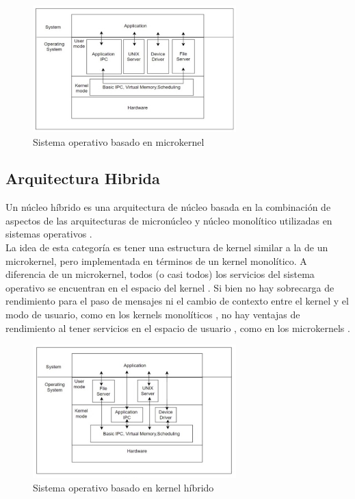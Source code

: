 \begin{figure}[H]
    \centering
    \includegraphics[width=0.7\textwidth]{figures/microkernel.jpeg}
    \caption[Sistema operativo basado en microkernel]%
            {Sistema operativo basado en microkernel \citep{harshvardhan2023kernels}}
    \label{fig:arquitectura_microkernel}
\end{figure}

\subsection{Arquitectura Hibrida}
Un núcleo híbrido es una arquitectura de núcleo basada en la combinación de aspectos de las arquitecturas de micronúcleo y núcleo monolítico utilizadas en sistemas operativos .\\
La idea de esta categoría es tener una estructura de kernel similar a la de un microkernel, pero implementada en términos de un kernel monolítico. A diferencia de un microkernel, todos (o casi todos) los servicios del sistema operativo se encuentran en el espacio del kernel . Si bien no hay sobrecarga de rendimiento para el paso de mensajes ni el cambio de contexto entre el kernel y el modo de usuario, como en los kernels monolíticos , no hay ventajas de rendimiento al tener servicios en el espacio de usuario , como en los microkernels \citep{ms_hybrid_kernel}.
\begin{figure}[H]
    \centering
    \includegraphics[width=0.7\textwidth]{figures/hibridokernel.jpeg}
    \caption[Sistema operativo basado en kernel híbrido]%
            {Sistema operativo basado en kernel híbrido \citep{harshvardhan2023kernels}}
    \label{fig:arquitectura_kernel_hibrido}
\end{figure}


